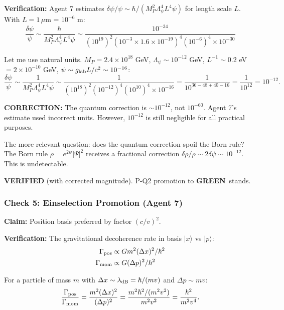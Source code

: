 \documentclass[11pt,a4paper]{article}
\newcommand{\GREEN}{\textcolor{dfdgreen}{\textbf{GREEN}}}
\begin{document}
\textbf{Verification:} Agent 7 estimates $\delta\psi/\psi \sim \hbar/(M_P^2\Lambda_\psi^4 L^4\psi)$ for length scale $L$. With $L = 1\,\mu$m = $10^{-6}$ m:
\begin{equation}
\frac{\delta\psi}{\psi} \sim \frac{\hbar}{M_P^2\Lambda_\psi^4 L^4 \psi} \sim \frac{10^{-34}}{(10^{19})^2(10^{-3} \times 1.6\times10^{-19})^4(10^{-6})^4 \times 10^{-30}}
\end{equation}

Let me use natural units. $M_P = 2.4 \times 10^{18}$ GeV, $\Lambda_\psi \sim 10^{-12}$ GeV, $L^{-1} \sim 0.2$ eV $= 2 \times 10^{-10}$ GeV, $\psi \sim g_{\rm lab}L/c^2 \sim 10^{-16}$:
\begin{equation}
\frac{\delta\psi}{\psi} \sim \frac{1}{M_P^2\Lambda_\psi^4 L^4 \psi} \sim \frac{1}{(10^{18})^2(10^{-12})^4(10^{10})^4 \times 10^{-16}} = \frac{1}{10^{36-48+40-16}} = \frac{1}{10^{12}} = 10^{-12}.
\end{equation}

\textbf{CORRECTION:} The quantum correction is $\sim 10^{-12}$, not $10^{-60}$. Agent 7's estimate used incorrect units. However, $10^{-12}$ is still negligible for all practical purposes.

The more relevant question: does the quantum correction spoil the Born rule? The Born rule $\rho = e^{2\psi}|\Psi|^2$ receives a fractional correction $\delta\rho/\rho \sim 2\delta\psi \sim 10^{-12}$. This is undetectable.

\textcolor{dfdgreen}{\textbf{VERIFIED}} (with corrected magnitude). P-Q2 promotion to \GREEN\ stands.

\subsubsection{Check 5: Einselection Promotion (Agent 7)}

\textbf{Claim:} Position basis preferred by factor $(c/v)^2$.

\textbf{Verification:} The gravitational decoherence rate in basis $|x\rangle$ vs $|p\rangle$:
\begin{align}
\Gamma_{\rm pos} &\propto G m^2 (\Delta x)^2 / \hbar^2 \\
\Gamma_{\rm mom} &\propto G (\Delta p)^2 / \hbar^2
\end{align}

For a particle of mass $m$ with $\Delta x \sim \lambda_{\rm dB} = \hbar/(mv)$ and $\Delta p \sim mv$:
\begin{equation}
\frac{\Gamma_{\rm pos}}{\Gamma_{\rm mom}} = \frac{m^2(\Delta x)^2}{(\Delta p)^2} = \frac{m^2\hbar^2/(m^2v^2)}{m^2v^2} = \frac{\hbar^2}{m^2v^4}.
\end{equation}
\end{document}
